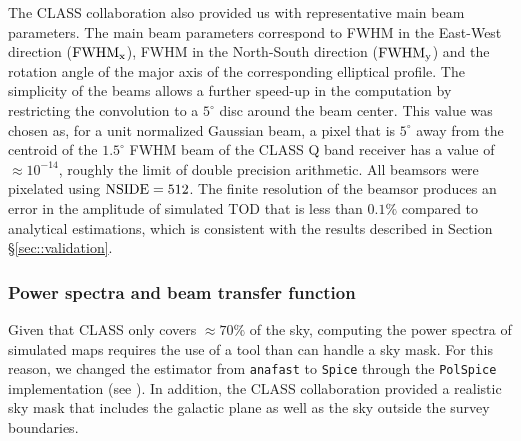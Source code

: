 \documentclass[a4paper,11pt]{article}
\begin{document}
The CLASS collaboration also provided us with representative main beam parameters. The main beam parameters correspond to FWHM in the East-West direction ($\rm{FWHM}_x$), FWHM in the North-South direction ($\rm{FWHM}_y$) and the rotation angle of the major axis of the corresponding elliptical profile. The simplicity of the beams allows a further speed-up in the computation by restricting the convolution to a $5^\circ$ disc around the beam center. This value was chosen as, for a unit normalized Gaussian beam, a pixel that is $5^\circ$ away from the centroid of the $1.5^{\circ}$ FWHM beam of the CLASS Q band receiver has a value of $\approx 10^{-14}$, roughly the limit of double precision arithmetic. All beamsors were pixelated using $\rm{NSIDE}=512$. The finite resolution of the beamsor produces an error in the amplitude of simulated TOD that is less than $0.1\%$ compared to analytical estimations, which is consistent with the results described in Section \S\ref{sec::validation}.


\subsubsection{Power spectra and beam transfer function}

Given that CLASS only covers $\approx 70\%$ of the sky, computing the power spectra of simulated maps requires the use of a tool than can handle a sky mask. For this reason, we changed the estimator from \texttt{anafast} to \texttt{Spice} through the \texttt{PolSpice} implementation (see \cite{2004MNRAS.350..914C}). In addition, the CLASS collaboration provided a realistic sky mask that includes the galactic plane as well as the sky outside the survey boundaries.
\end{document}
